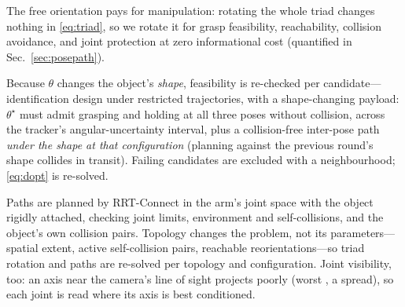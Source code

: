 The free orientation pays for manipulation: rotating the whole triad changes
nothing in \eqref{eq:triad}, so we rotate it for grasp feasibility,
reachability, collision avoidance, and joint protection at zero informational
cost (quantified in Sec.~\ref{sec:posepath}).

Because $\theta$ changes the object's \emph{shape}, feasibility is re-checked
per candidate---identification design under restricted
trajectories, with a shape-changing payload:
$\theta^\star$ must admit grasping and holding at all three poses without
collision, across the tracker's angular-uncertainty interval, plus a
collision-free inter-pose path \emph{under the shape at that configuration}
(planning against the previous round's shape collides in transit). Failing
candidates are excluded with a neighbourhood; \eqref{eq:dopt} is re-solved.

Paths are planned by RRT-Connect in the arm's joint space with the object
rigidly attached, checking joint limits, environment and self-collisions,
and the object's own collision pairs. Topology changes the problem, not its
parameters---spatial extent, active self-collision pairs, reachable
reorientations---so triad rotation and paths are re-solved per topology and
configuration. Joint visibility, too: an axis near the camera's line of
sight projects poorly (worst , a
\rev{$4.1\times$} spread), so each joint is read where its axis is best
conditioned.

